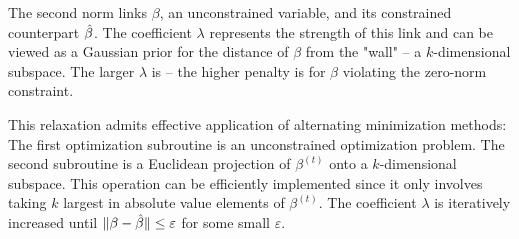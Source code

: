 \documentclass[11pt,letterpaper]{article}
\numberwithin{equation}{section} %
\numberwithin{figure}{section} %
\numberwithin{table}{section} %
\begin{document}
The second norm links $\beta$, an unconstrained variable, and its constrained counterpart $\hat\beta$. The coefficient $\lambda$ represents the strength of this link and can be viewed as a Gaussian prior for the distance of $\beta$ from the "wall" -- a $k$-dimensional subspace. The larger $\lambda$ is -- the higher penalty is for $\beta$ violating the zero-norm constraint. 
 
This relaxation admits effective application of alternating minimization methods:
The first optimization subroutine is an unconstrained optimization problem. The second subroutine is a Euclidean projection of $\beta^{(t)}$ onto a $k$-dimensional subspace. This operation can be efficiently implemented since it only involves taking $k$ largest in absolute value elements of $\beta^{(t)}$. The coefficient $\lambda$ is iteratively increased until $\|\beta - \hat\beta\| \leq \varepsilon$ for some small $\varepsilon$.
\end{document}
